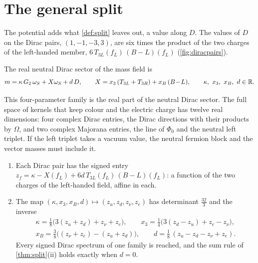 \section{The general split}
\label{sec:splitgeneral}

The potential adds what \cref{def:split} leaves out, a value along $D$. The values of $D$ on the Dirac pairs, $(1,-1,-3,3)$, are six times the
product of the two charges of the left-handed member, $6\,T_{3L}(f_L)\,(B\!-\!L)(f_L)$ (\cref{fig:diracpairs}).

\begin{definition}
\label{def:splitgen}
The real neutral Dirac sector of the mass field is
\[
m=\kappa\,G_2\,\omega_S+X\omega_S+d\,D,\qquad X=x_3\,(T_{3L}+T_{3R})+x_B\,(B\!-\!L),\qquad \kappa,\ x_3,\ x_B,\ d\in\mathbb{R} .
\]
\end{definition}

This four-parameter family is the real part of the neutral Dirac sector. The full space of kernels that keep colour and the electric charge
has twelve real dimensions: four complex Dirac entries, the Dirac directions with their products by $\Omega$, and two complex Majorana entries,
the line of $\Phi_0$ and the neutral left triplet. If the left triplet takes a vacuum value, the neutral fermion block and the vector masses
must include it.

\begin{theorem}
\label{thm:splitgen}
\begin{enumerate}[label=(\roman*),leftmargin=2.2em,itemsep=1pt]
\item Each Dirac pair has the signed entry $z_f=\kappa-X(f_L)+6d\,T_{3L}(f_L)\,(B\!-\!L)(f_L)$: a function of the two charges of the
left-handed field, affine in each.
\item The map $(\kappa,x_3,x_B,d)\mapsto(z_u,z_d,z_\nu,z_e)$ has determinant $\tfrac{32}3$ and the inverse
\[
\begin{gathered}
\kappa=\tfrac18\bigl(3(z_u+z_d)+z_\nu+z_e\bigr),\qquad x_3=\tfrac14\bigl(3(z_d-z_u)+z_e-z_\nu\bigr),\\
x_B=\tfrac38\bigl((z_\nu+z_e)-(z_u+z_d)\bigr),\qquad d=\tfrac18\,(z_u-z_d-z_\nu+z_e).
\end{gathered}
\]
Every signed Dirac spectrum of one family is reached, and the sum rule of \cref{thm:split}(ii) holds exactly when $d=0$.
\end{enumerate}
\end{theorem}

